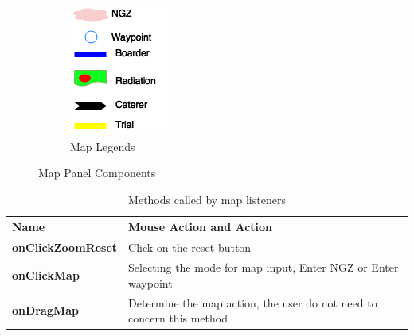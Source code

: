 \begin{figure}[H]
\begin{subfigure}[t]{0.25\textwidth}
		\includegraphics[width=0.95\linewidth]{maplegends.png}  
		\caption{Map Legends}
		\label{fig:Map Legends}                
	\end{subfigure}
	\caption{Map Panel Components}
\end{figure}

\begin{table}[H]
	\centering
	\caption{Methods called by map listeners}
	\label{Methods called by map listeners}
	\begin{tabular}{|l|l|}
		\hline
		\textbf{Name}             & Mouse Action and Action                                                                                                                                                                                                                             \\ \hline
		\textbf{onClickZoomReset} & Click on the reset button                                                                                                                                                                                                                           \\ \hline
		\textbf{onClickMap}       & Selecting the mode for map input, Enter NGZ or Enter waypoint \\ \hline
		\textbf{onDragMap}        & Determine the map action, the user do not need to concern this method                                                                                                                                                                               \\ \hline
	\end{tabular}
\end{table}

